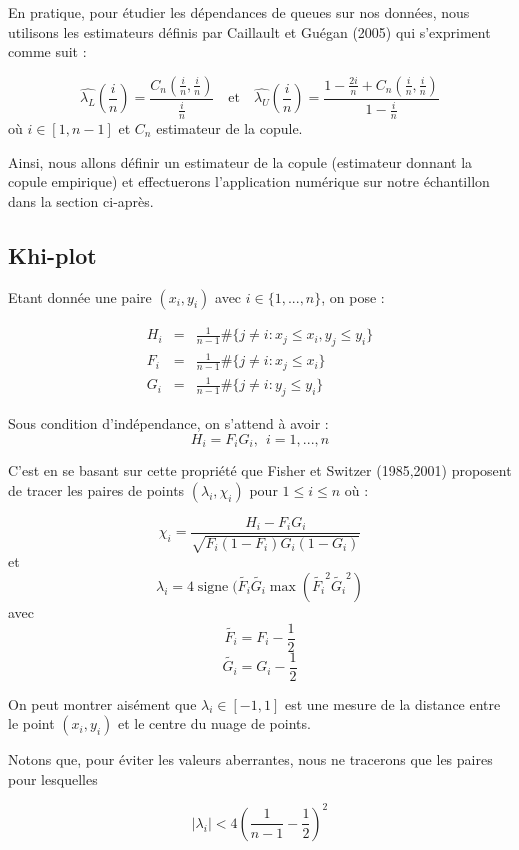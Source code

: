 En pratique, pour étudier les dépendances de queues sur nos données, nous utilisons les estimateurs définis par Caillault et Guégan
(2005) qui s'expriment comme suit :

$$
\widehat{\lambda_L}\left(\frac{i}{n}\right) = \frac{C_n(\frac{i}{n},\frac{i}{n})}{\frac{i}{n}}    \text{~~~et~~~} 
\widehat{\lambda_U}\left(\frac{i}{n}\right) = \frac{1-\frac{2i}{n} + C_n(\frac{i}{n},\frac{i}{n})}{ 1 - \frac{i}{n}}
$$
où $i \in [1,n-1]$ et $C_n$ estimateur de la copule.

Ainsi, nous allons définir un estimateur de la copule (estimateur donnant la copule empirique) et effectuerons l'application numérique sur notre échantillon 
dans la section ci-après.

\subsection{Khi-plot}

Etant donnée une paire $(x_i,y_i)$ avec $i \in \{1,...,n\}$, on pose :

\begin{eqnarray*}
H_i &=& \frac{1}{n-1} \# \{j \neq i : x_j \leq x_i , y_j \leq y_i \} \\
F_i &=& \frac{1}{n-1} \# \{j \neq i : x_j \leq x_i \} \\
G_i &=& \frac{1}{n-1} \# \{j \neq i : y_j \leq y_i \} 
\end{eqnarray*}

Sous condition d'indépendance, on s'attend à avoir :
$$
H_i = F_i G_i, ~~i=1,...,n
$$

C'est en se basant sur cette propriété que Fisher et Switzer (1985,2001) proposent de tracer les paires de points $(\lambda_i,\chi_i)$ pour $1\leq i \leq n$ où :

$$
\chi_i = \frac{H_i-F_i G_i}{\sqrt{F_i(1-F_i)G_i(1-G_i)}}
$$
et
$$
\lambda_i = 4 \operatorname{signe}( \widetilde{F_i} \widetilde{G_i} \operatorname{max}(\widetilde{F_i}^2 \widetilde{G_i}^2  )
$$
avec
$$
\widetilde{F_i} = F_i - \frac{1}{2}
$$
$$
\widetilde{G_i} = G_i - \frac{1}{2}
$$

On peut montrer aisément que $\lambda_i \in [-1,1]$ est une mesure de la distance entre le point $(x_i,y_i)$ et le centre du nuage de points.

Notons que, pour éviter les valeurs aberrantes, nous ne tracerons que les paires pour lesquelles 

$$
|\lambda_i| < 4 \left(  \frac{1}{n-1} -\frac{1}{2} \right)^2
$$

